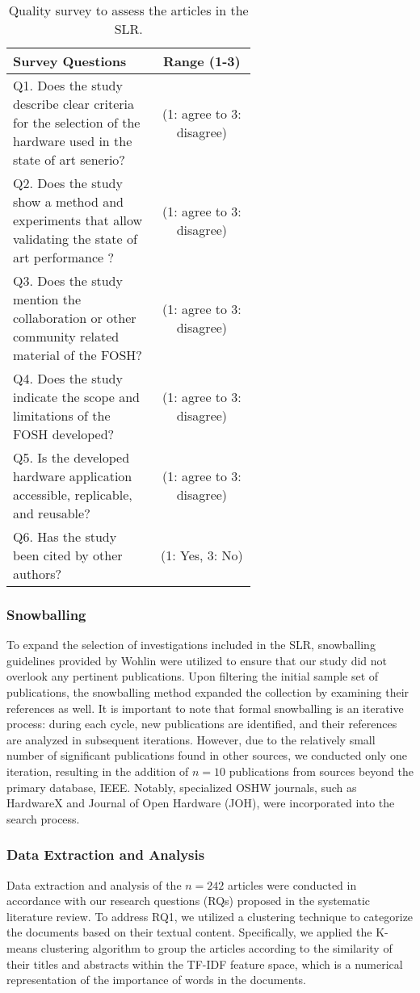\begin{table}[htbp]
\centering
\caption{Quality survey to assess the articles in the SLR.}
\begin{tabular}{|p{0.6\linewidth}|c|}
\hline
\textbf{Survey Questions} & \textbf{Range (1-3)} \\
\hline
Q1. Does the study describe clear criteria for the selection of the hardware used in the state of art senerio? & (1: agree to 3: disagree) \\
\hline
Q2. Does the study show a method and experiments that allow validating the state of art performance ? & (1: agree to 3: disagree) \\
\hline
Q3. Does the study mention the collaboration or other community related material of the FOSH? & (1: agree to 3: disagree) \\
\hline
Q4. Does the study indicate the scope and limitations of the FOSH developed? & (1: agree to 3: disagree) \\
\hline
Q5. Is the developed hardware application accessible, replicable, and reusable? & (1: agree to 3: disagree) \\
\hline
Q6. Has the study been cited by other authors? & (1: Yes, 3: No) \\
\hline
\end{tabular}
\end{table}


\subsubsection{Snowballing}

To expand the selection of investigations included in the SLR, snowballing guidelines provided by Wohlin \cite{wohlin2014guidelines} were utilized to ensure that our study did not overlook any pertinent publications. Upon filtering the initial sample set of publications, the snowballing method expanded the collection by examining their references as well. It is important to note that formal snowballing is an iterative process: during each cycle, new publications are identified, and their references are analyzed in subsequent iterations. However, due to the relatively small number of significant publications found in other sources, we conducted only one iteration, resulting in the addition of $n=10$ publications from sources beyond the primary database, IEEE. Notably, specialized OSHW journals, such as HardwareX and Journal of Open Hardware (JOH), were incorporated into the search process.
\subsubsection{Data Extraction and Analysis}
Data extraction and analysis of the $n=242$ articles were conducted in accordance with our research questions (RQs) proposed in the systematic literature review. To address RQ1, we utilized a clustering technique to categorize the documents based on their textual content. Specifically, we applied the K-means clustering algorithm to group the articles according to the similarity of their titles and abstracts within the TF-IDF feature space, which is a numerical representation of the importance of words in the documents.

